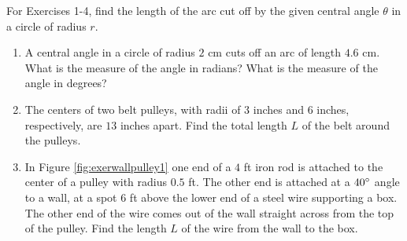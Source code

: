 {\small
\par\noindent For Exercises 1-4, find the length of the arc cut off by the given central angle
$\theta$ in a circle of radius $r$.
\begin{enumerate}[\bfseries 1.]
 \item A central angle in a circle of radius $2$ cm cuts off an arc of length $4.6$ cm.
  What is the measure of the angle in radians? What is the measure of the angle in degrees?
 \item The centers of two belt pulleys, with radii of $3$ inches and $6$ inches, respectively, are
  $13$ inches apart. Find the total length $L$ of the belt around the pulleys.
 \item\label{exer:wallpulley1} In Figure \ref{fig:exerwallpulley1} one end of a $4$ ft iron rod is
  attached to the center of a pulley with radius $0.5$ ft. The other end is attached at a
  $40^\circ$ angle to a wall, at a spot $6$ ft above the lower end of a steel wire supporting a
  box. The other end of the wire comes out of the wall straight across from the top of the pulley.
  Find the length $L$ of the wire from the wall to the box.
\begin{figure}[h]
\begin{minipage}[t]{7.5cm}
 \begin{center}
\end{center}
\end{minipage}
\end{figure}
\end{enumerate}}
